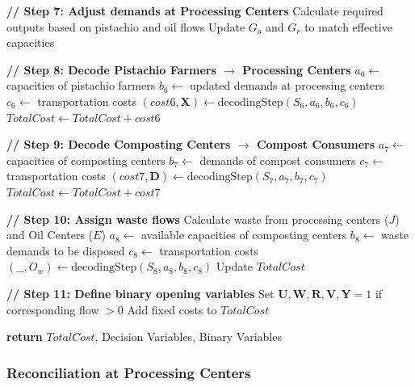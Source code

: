 \documentclass[preprint,12pt,authoryear]{elsarticle}
\begin{document}
\begin{algorithm}
  \caption{Chromosome decoding (Part 2): Upstream flows and waste management}
  \label{algoDecode2}
  \begin{algorithmic}[1]
  \State \textbf{// Step 7: Adjust demands at Processing Centers}
      \State Calculate required outputs based on pistachio and oil flows
      \State Update $G_o$ and $G_r$ to match effective capacities
  \EndFor

  \State \textbf{// Step 8: Decode Pistachio Farmers $\rightarrow$ Processing Centers}
  \State $a_6 \leftarrow$ capacities of pistachio farmers
  \State $b_6 \leftarrow$ updated demands at processing centers
  \State $c_6 \leftarrow$ transportation costs
  \State $(cost6, \mathbf{X}) \leftarrow \text{decodingStep}(S_6, a_6, b_6, c_6)$
  \State $TotalCost \leftarrow TotalCost + cost6$
    
  \State \textbf{// Step 9: Decode Composting Centers $\rightarrow$ Compost Consumers}
  \State $a_7 \leftarrow$ capacities of composting centers
  \State $b_7 \leftarrow$ demands of compost consumers
  \State $c_7 \leftarrow$ transportation costs
  \State $(cost7, \mathbf{D}) \leftarrow \text{decodingStep}(S_7, a_7, b_7, c_7)$
  \State $TotalCost \leftarrow TotalCost + cost7$
    
  \State \textbf{// Step 10: Assign waste flows}
  \State Calculate waste from processing centers ($J$) and Oil Centers ($E$)
  \State $a_8 \leftarrow$ available capacities of composting centers
  \State $b_8 \leftarrow$ waste demands to be disposed
  \State $c_8 \leftarrow$ transportation costs
  \State $(\_\_, O_w) \leftarrow \text{decodingStep}(S_8, a_8, b_8, c_8)$
  \State Update $TotalCost$
    
  \State \textbf{// Step 11: Define binary opening variables}
  \State Set $\mathbf{U}, \mathbf{W}, \mathbf{R}, \mathbf{V}, \mathbf{Y} = 1$ if corresponding flow $> 0$
  \State Add fixed costs to $TotalCost$
    
  \State \textbf{return} $TotalCost$, Decision Variables, Binary Variables
  \EndProcedure
  \end{algorithmic}
\end{algorithm}

\subsubsection{Reconciliation at Processing Centers}
\label{subsubsec:reconciliation}
\end{document}
